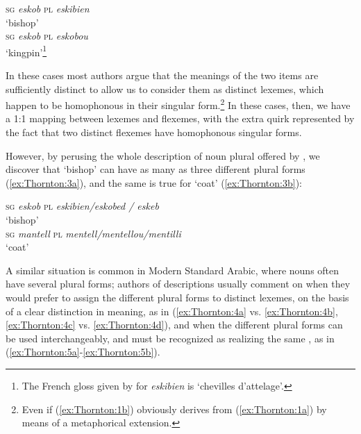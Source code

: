 \documentclass[output=paper]{langsci/langscibook}
\begin{document}
\ea \label{ex:Thornton:2a}\textsc{sg} \emph{eskob} \textsc{pl} \emph{eskibien}\\
\glt `bishop'\\


\ex \label{ex:Thornton:2b}\textsc{sg} \emph{eskob} \textsc{pl} \emph{eskobou}\\
\glt `kingpin'\footnote{The French gloss given by %
\citet[73]{Trepos1980} %
%
for
  \emph{eskibien} is `chevilles d'attelage'.}\\
\z
\z

In these cases most authors argue that the meanings of the two items are
sufficiently distinct to allow us to consider them as distinct lexemes,
which happen to be homophon\-ous in their singular form.\footnote{Even if
  (\ref{ex:Thornton:1b}) obviously derives from (\ref{ex:Thornton:1a}) by means of a metaphorical extension.}
In these cases, then, we have a 1:1 mapping between lexemes and
flexemes, with the extra quirk represented by the fact that two distinct
flexemes have homophonous singular forms.

However, by perusing the whole description of  noun plural offered
by %
\citet{Trepos1980}%
%
, we discover that `bishop' can have as many as three
different plural forms (\ref{ex:Thornton:3a}), and the same is true for `coat' (\ref{ex:Thornton:3b}):

\ea\label{ex:Thornton:3}  %
\citep[§ 149]{Trepos1980}%
%


\ea\label{ex:Thornton:3a}\textsc{sg} \emph{eskob} \textsc{pl} \emph{eskibien\slash{}eskobed /
eskeb}\\
\glt `bishop'\\

\ex\label{ex:Thornton:3b}\textsc{sg} \emph{mantell} \textsc{pl} \emph{mentell\slash{}mentellou\slash{}mentilli}\\
\glt `coat'\\
\z
\z

A similar situation is common in Modern Standard Arabic, where nouns
often have several plural forms; authors of descriptions usually comment
on when they would prefer to assign the different plural forms to
distinct lexemes, on the basis of a clear distinction in meaning, as in
(\ref{ex:Thornton:4a} vs. \ref{ex:Thornton:4b}, \ref{ex:Thornton:4c} vs. \ref{ex:Thornton:4d}), and when the different plural forms can be used
interchangeably, and must be recognized as realizing the same , as
in (\ref{ex:Thornton:5a}-\ref{ex:Thornton:5b}).
\end{document}
